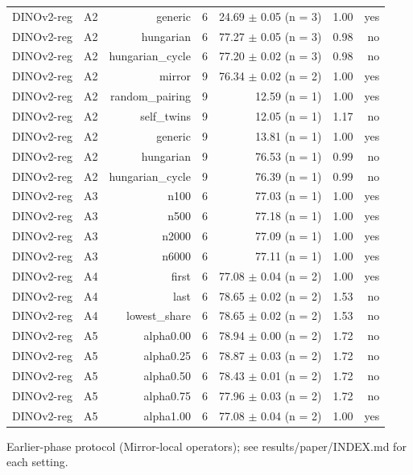 \begin{table}[t]
\begin{tabular}{lrrrrrr}
DINOv2-reg & A2 & generic & 6 & 24.69 $\pm$ 0.05 (n = 3) & 1.00 & yes \\
DINOv2-reg & A2 & hungarian & 6 & 77.27 $\pm$ 0.05 (n = 3) & 0.98 & no \\
DINOv2-reg & A2 & hungarian\_cycle & 6 & 77.20 $\pm$ 0.02 (n = 3) & 0.98 & no \\
DINOv2-reg & A2 & mirror & 9 & 76.34 $\pm$ 0.02 (n = 2) & 1.00 & yes \\
DINOv2-reg & A2 & random\_pairing & 9 & 12.59 (n = 1) & 1.00 & yes \\
DINOv2-reg & A2 & self\_twins & 9 & 12.05 (n = 1) & 1.17 & no \\
DINOv2-reg & A2 & generic & 9 & 13.81 (n = 1) & 1.00 & yes \\
DINOv2-reg & A2 & hungarian & 9 & 76.53 (n = 1) & 0.99 & no \\
DINOv2-reg & A2 & hungarian\_cycle & 9 & 76.39 (n = 1) & 0.99 & no \\
DINOv2-reg & A3 & n100 & 6 & 77.03 (n = 1) & 1.00 & yes \\
DINOv2-reg & A3 & n500 & 6 & 77.18 (n = 1) & 1.00 & yes \\
DINOv2-reg & A3 & n2000 & 6 & 77.09 (n = 1) & 1.00 & yes \\
DINOv2-reg & A3 & n6000 & 6 & 77.11 (n = 1) & 1.00 & yes \\
DINOv2-reg & A4 & first & 6 & 77.08 $\pm$ 0.04 (n = 2) & 1.00 & yes \\
DINOv2-reg & A4 & last & 6 & 78.65 $\pm$ 0.02 (n = 2) & 1.53 & no \\
DINOv2-reg & A4 & lowest\_share & 6 & 78.65 $\pm$ 0.02 (n = 2) & 1.53 & no \\
DINOv2-reg & A5 & alpha0.00 & 6 & 78.94 $\pm$ 0.00 (n = 2) & 1.72 & no \\
DINOv2-reg & A5 & alpha0.25 & 6 & 78.87 $\pm$ 0.03 (n = 2) & 1.72 & no \\
DINOv2-reg & A5 & alpha0.50 & 6 & 78.43 $\pm$ 0.01 (n = 2) & 1.72 & no \\
DINOv2-reg & A5 & alpha0.75 & 6 & 77.96 $\pm$ 0.03 (n = 2) & 1.72 & no \\
DINOv2-reg & A5 & alpha1.00 & 6 & 77.08 $\pm$ 0.04 (n = 2) & 1.00 & yes \\
\bottomrule
\end{tabular}
\par\smallskip\footnotesize Earlier-phase protocol (Mirror-local operators); see results/paper/INDEX.md for each setting.
\end{table}
